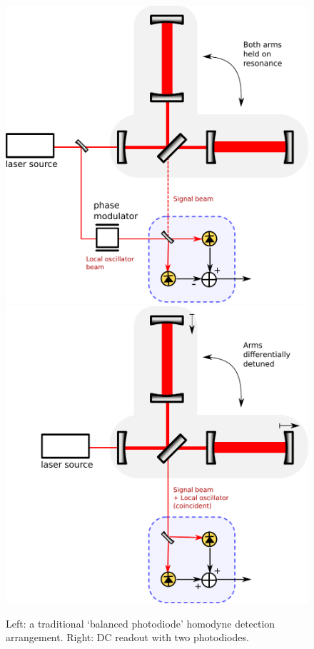 \begin{figure}
\includegraphics[width=0.5\columnwidth]{figures/homodyne-standard.pdf}
\includegraphics[width=0.5\columnwidth]{figures/homodyne-dc.pdf}
\caption[Comparison of DC readout with balanced homodyne
  detection]{Left: a traditional `balanced photodiode' homodyne
  detection arrangement. Right: DC readout with two photodiodes.
  \label{fig:balanced-homodyne}
}
\end{figure}
%
